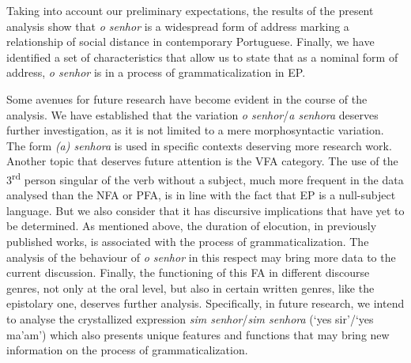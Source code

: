 \documentclass[output=paper]{langscibook}
\begin{document}
Taking into account our preliminary expectations, the results of the present analysis show that \textit{o senhor} is a widespread form of address marking a relationship of social distance in contemporary Portuguese. Finally, we have identified a set of characteristics that allow us to state that as a nominal form of address, \textit{o senhor} is in a process of grammaticalization in EP.



Some avenues for future research have become evident in the course of the analysis. We have established that the variation \textit{o senhor}\slash\textit{a senhora} deserves further investigation, as it is not limited to a mere morphosyntactic variation. The form \textit{(a) senhora} is used in specific contexts deserving more research work. Another topic that deserves future attention is the VFA category. The use of the 3\textsuperscript{rd} person singular of the verb without a subject, much more frequent in the data analysed than the NFA or PFA, is in line with the fact that EP is a null-subject language. But we also consider that it has discursive implications that have yet to be determined. As mentioned above, the duration of elocution, in previously published works, is associated with the process of grammaticalization. The analysis of the behaviour of \textit{o senhor} in this respect may bring more data to the current discussion. Finally, the functioning of this FA in different discourse genres, not only at the oral level, but also in certain written genres, like the epistolary one, deserves further analysis. Specifically, in future research, we intend to analyse the crystallized expression \textit{sim senhor}\slash\textit{sim senhora} (‘yes sir’\slash ‘yes ma’am’) which also presents unique features and functions that may bring new information on the process of grammaticalization.

\printbibliography[heading=subbibliography]
\end{document}
